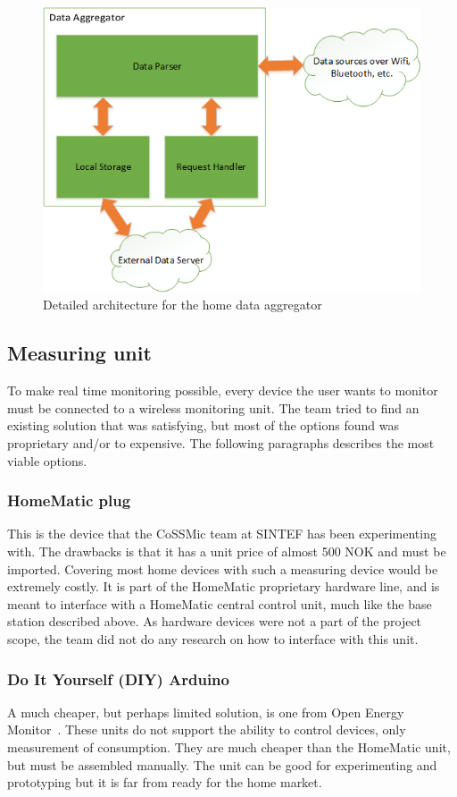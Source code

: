 \begin{figure}[H]
\centering
\includegraphics[height=0.4\textheight]{ch/further/fig/home.png}
\caption{Detailed architecture for the home data aggregator}
\label{fig:aggregator}
\end{figure}

\subsection{Measuring unit}
To make real time monitoring possible, every device the user wants to monitor must be connected to a wireless monitoring unit. The team tried to find an existing solution that was satisfying, but most of the options found was proprietary and/or to expensive. The following paragraphs describes the most viable options.

\subsubsection{HomeMatic plug}
This is the device that the CoSSMic team at SINTEF has been experimenting with. The drawbacks is that it has a unit price of almost 500 NOK and must be imported. Covering most home devices with such a measuring device would be extremely costly. It is part of the HomeMatic proprietary hardware line, and is meant to interface with a HomeMatic central control unit, much like the base station described above. As hardware devices were not a part of the project scope, the team did not do any research on how to interface with this unit. %

\subsubsection{Do It Yourself (DIY) Arduino}
A much cheaper, but perhaps limited solution, is one from Open Energy Monitor~\cite{oemmodule}. These units do not support the ability to control devices, only measurement of consumption. They are much cheaper than the HomeMatic unit, but must be assembled manually. The unit can be good for experimenting and prototyping but it is far from ready for the home market.
